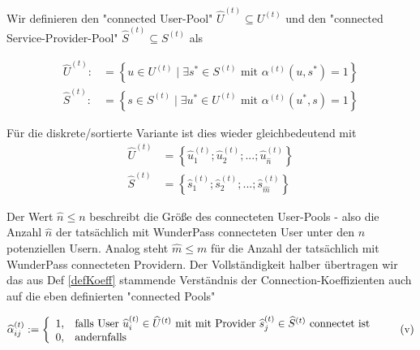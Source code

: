 \begin{Def}\label{defPools}

Wir definieren den "connected User-Pool" $\widehat{U}^{(t)} \subseteq U^{(t)}$ und den "connected Service-Provider-Pool" $\widehat{S}^{(t)} \subseteq S^{(t)}$ als

\begin{align}
\widehat{U}^{(t)}:&= \left\{u \in U^{(t)} \mid \exists s^{*} \in S^{(t)} \textrm{ mit } \alpha^{(t)}(u, s^{*}) = 1 \right\} \tag{i} \\ 
\widehat{S}^{(t)}:&= \left\{s \in S^{(t)} \mid \exists u^{*} \in U^{(t)} \textrm{ mit } \alpha^{(t)}(u^{*}, s) = 1 \right\} \tag{ii}
\end{align}

\vspace{0.3cm}

Für die diskrete/sortierte Variante ist dies wieder gleichbedeutend mit
\begin{align}
\widehat{U}^{(t)} &= \left\{ \widehat{u}^{(t)}_1; \widehat{u}^{(t)}_2;...; \widehat{u}^{(t)}_{\widehat{n}} \right\} \tag{iii} \\ 
\widehat{S}^{(t)} &= \left\{ \widehat{s}^{(t)}_1; \widehat{s}^{(t)}_2;...; \widehat{s}^{(t)}_{\widehat{m}}\right\} \tag{iv}
\end{align}

\vspace{0.6cm}

Der Wert $\widehat{n} \leq n$ beschreibt die Größe des connecteten User-Pools - also die Anzahl $\widehat{n}$ der tatsächlich mit WunderPass connecteten User unter den $n$ potenziellen Usern. Analog steht $\widehat{m} \leq m$ für die Anzahl der tatsächlich mit WunderPass connecteten Providern. Der Vollständigkeit halber übertragen wir das aus Def \ref{defKoeff} stammende Verständnis der Connection-Koeffizienten auch auf die eben definierten "connected Pools"

\[
\widehat{\alpha}^{(t)}_{ij}:=\left\{%
\begin{array}{ll}
    1, & \hbox{falls User $\widehat{u}^{(t)}_i \in \widehat{U}^{(t)}$ mit mit Provider $\widehat{s}^{(t)}_j \in \widehat{S}^{(t)}$ connectet ist} \\
    0, & \hbox{andernfalls} \\
\end{array}%
\right. \tag{v}
\] 

\end{Def}

\vspace{0.6cm}

